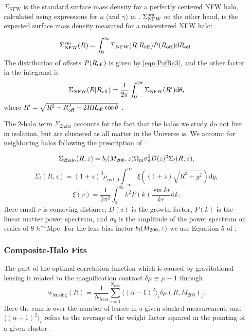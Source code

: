 $\Sigma_{\mathrm{NFW}}$ is the standard surface mass density for a perfectly centered \ac{NFW} halo, calculated using expressions for $\kappa$ (and $\gamma$) in \citet{Wright00}. $\Sigma_{\mathrm{NFW}}^{\rm sm}$ on the other hand, is the expected surface mass density measured for a miscentered \ac{NFW} halo:

\begin{equation}
\Sigma_{\rm NFW}^{\rm sm}(R)  = \int_0^\infty \Sigma_{\rm NFW}(R \vert R_{\rm{off}}) P(R_{\rm off}) \mathrm{d}R_{\rm off }.
\end{equation}
The distribution of offsets $P(R_{\rm{off}})$ is given by \autoref{eqn:PofRc3}, and the other factor in the integrand is
\begin{equation}
\Sigma_{\mathrm{NFW}}(R \vert R_{\rm{off}}) = \frac{1}{2\pi} \int_0^{2\pi} \Sigma_{\mathrm{NFW}}(R') \mathrm{d}\theta,
\end{equation}
where $R' = \sqrt{R^2 + R_{\rm{off}}^2 + 2RR_{\rm{off}}\cos\theta}$ \citep{Yang06}.

The 2-halo term $\Sigma_{\mathrm{2halo}}$ accounts for the fact that the halos we study do not live in isolation, but are clustered as all matter in the Universe is. We account for neighboring halos following the prescription of \citet{Johnston07}:

\begin{equation}
\Sigma_{\mathrm{2halo}}(R,z) = b_{\rm l}(M_{200},z) \Omega_{\rm m} \sigma_8^2 D(z)^2 \Sigma_l(R,z),
\end{equation}
\begin{equation}
\Sigma_l(R,z) = (1+z)^3 \rho_{crit,0} \int_{-\infty}^\infty \xi\left( (1+z)\sqrt{R^2 + y^2} \right) \mathrm{d}y,
\end{equation}
\begin{equation}
\xi(r) = \frac{1}{2\pi^2} \int_0^\infty k^2 P(k) \frac{\sin{kr}}{kr} \mathrm{d}k.
\end{equation}
Here small $r$ is comoving distance, $D(z)$ is the growth factor, $P(k)$ is the linear matter power spectrum, and $\sigma_8$ is the amplitude of the power spectrum on scales of 8 $h^{-1}$Mpc. For the lens bias factor $b_{\rm l}(M_{200},z)$ we use Equation 5 of \citet{Seljak04}.


\subsubsection{Composite-Halo Fits}
\label{sec:multihalo3}
The part of the optimal correlation function which is caused by gravitational lensing is related to the magnification contrast $\delta\mu \equiv \mu-1$ through
\begin{equation}
\label{eqn:wmodel3}
\mathrm{w}_{\mathrm{lensing}}(R) = \frac{1}{N_{lens}} \sum_{i=1}^{N_{lens}} \langle(\alpha-1)^2\rangle_i \delta\mu(R,M_{200})_i.
\end{equation}
Here the sum is over the number of lenses in a given stacked measurement, and $\langle(\alpha-1)^2\rangle_i$ refers to the average of the weight factor squared in the pointing of a given cluster.


